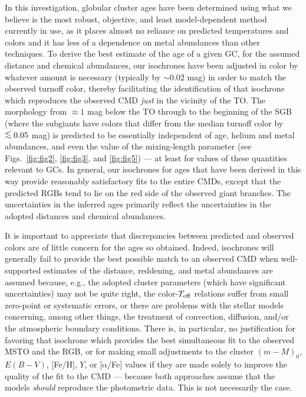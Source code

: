 \documentclass[12pt,preprint]{aastex}
\newcommand\teff{{T_{\rm eff}}}
\newcommand\lta{\mathrel{\hbox{\raise 0.6 ex \hbox{$<$}\kern
                   -1.8 ex\lower .5 ex\hbox{$\sim$}}}}
\begin{document}
In this investigation, globular cluster ages have been determined using what we
believe is the most robust, objective, and least model-dependent method
currently in use, as it places almost no reliance on predicted temperatures and
colors and it has less of a dependence on metal abundances than other
techniques.  To derive the best estimate of the age of a given GC, for the 
assumed distance and chemical abundances, our isochrones have been adjusted in
color by whatever amount is necessary (typically by $\sim 0.02$ mag) in order to
match the observed turnoff color, thereby facilitating the identification of
that isochrone which reproduces the observed CMD {\it just} in the vicinity of
the TO.  The morphology from $\approx 1$ mag below the TO through to the
beginning of the SGB (where the subgiants have colors that differ from the
median turnoff color by $\lta 0.05$ mag) is predicted to be essentially
independent of age, helium and metal abundances, and even the value of the
mixing-length parameter (see Figs.~\ref{fig:fig2}, \ref{fig:fig3}, and
\ref{fig:fig5}) --- at least for values of these quantities relevant to GCs.
In general, our isochrones for ages that have been derived in this way provide
reasonably satisfactory fits to the entire CMDs, except that the predicted RGBs
tend to lie on the red side of the observed giant branches.  The uncertainties
in the inferred ages primarily reflect the uncertainties in the adopted
distances and chemical abundances. 

It is important to appreciate that discrepancies between predicted and observed
colors are of little concern for the ages so obtained.  Indeed, isochrones will
generally fail to provide the best possible match to an observed CMD when
well-supported estimates of the distance, reddening, and metal abundances are
assumed because, e.g., the adopted cluster parameters (which have significant
uncertainties) may not be quite right, the color-$\teff$ relations suffer from
small zero-point or systematic errors, or there are problems with the stellar
models concerning, among other things, the treatment of convection, diffusion,
and/or the atmospheric boundary conditions.  There is, in particular, no
justification for favoring that isochrone which provides the best simultaneous
fit to the observed MSTO and the RGB, or for making small adjustments to the
cluster $(m-M)_0$, $E(B-V)$, [Fe/H], $Y$, or [$\alpha$/Fe] values if they are
made solely to improve the quality of the fit to the CMD --- because both
approaches assume that the models {\it should} reproduce the photometric data.
This is not necessarily the case.
\end{document}
